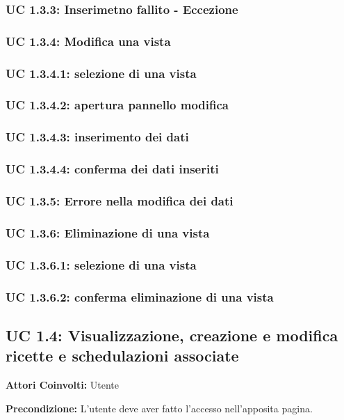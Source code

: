 \subsubsection{UC 1.3.3: Inserimetno fallito - Eccezione}
\subsubsection{UC 1.3.4: Modifica una vista}
\subsubsection{UC 1.3.4.1: selezione di una vista}
\subsubsection{UC 1.3.4.2: apertura pannello modifica}
\subsubsection{UC 1.3.4.3: inserimento dei dati}
\subsubsection{UC 1.3.4.4: conferma dei dati inseriti}
\subsubsection{UC 1.3.5: Errore nella modifica dei dati}
\subsubsection{UC 1.3.6: Eliminazione di una vista}
\subsubsection{UC 1.3.6.1: selezione di una vista}
\subsubsection{UC 1.3.6.2: conferma eliminazione di una vista}



\subsection{UC 1.4: Visualizzazione, creazione e modifica ricette e schedulazioni associate}

\textbf{Attori Coinvolti:}
Utente

\textbf{Precondizione:}
L’utente deve aver fatto l’accesso nell’apposita pagina.

